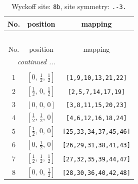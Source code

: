 \documentclass[fleqn,8pt]{jsarticle}
\begin{document}
\begin{longtable}{ccc}
\caption{Wyckoff site: {\tt 8b}, site symmetry: {\tt .-3.}}
 \\
 \hline \hline
No. & position & mapping \\ \hline \endfirsthead

\multicolumn{2}{l}{\tablename\ \thetable{}} \\
 \hline \hline
No. & position & mapping \\ \hline \endhead

 \hline \hline
\multicolumn{2}{r}{\footnotesize\it continued ...} \\ \endfoot

 \hline \hline
\multicolumn{2}{r}{} \\ \endlastfoot

1 & $\left[ 0,\, \frac{1}{2},\, \frac{1}{2} \right]$ & {\tt [1,9,10,13,21,22]} \\ \hline
2 & $\left[ \frac{1}{2},\, 0,\, \frac{1}{2} \right]$ & {\tt [2,5,7,14,17,19]} \\ \hline
3 & $\left[ 0,\, 0,\, 0 \right]$ & {\tt [3,8,11,15,20,23]} \\ \hline
4 & $\left[ \frac{1}{2},\, \frac{1}{2},\, 0 \right]$ & {\tt [4,6,12,16,18,24]} \\ \hline
5 & $\left[ \frac{1}{2},\, 0,\, 0 \right]$ & {\tt [25,33,34,37,45,46]} \\ \hline
6 & $\left[ 0,\, \frac{1}{2},\, 0 \right]$ & {\tt [26,29,31,38,41,43]} \\ \hline
7 & $\left[ \frac{1}{2},\, \frac{1}{2},\, \frac{1}{2} \right]$ & {\tt [27,32,35,39,44,47]} \\ \hline
8 & $\left[ 0,\, 0,\, \frac{1}{2} \right]$ & {\tt [28,30,36,40,42,48]} \\
\end{longtable}
\renewcommand{\arraystretch}{1.2}
\end{document}
